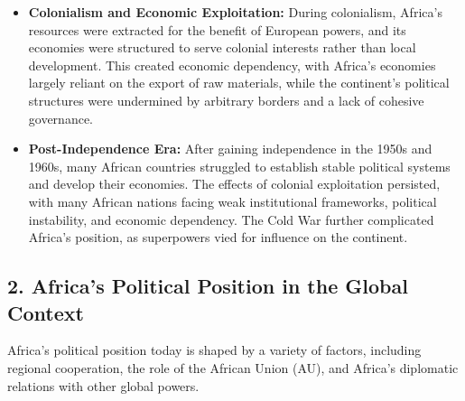 \documentclass[10pt]{article}
\begin{document}
\begin{itemize}
  \item \textbf{Colonialism and Economic Exploitation:} During colonialism, Africa's resources were
    extracted for the benefit of European powers, and its economies were structured to
    serve colonial interests rather than local development. This created economic
    dependency, with Africa's economies largely reliant on the export of raw materials, while
    the continent's political structures were undermined by arbitrary borders and a lack of
    cohesive governance.

  \item \textbf{Post-Independence Era:} After gaining independence in the 1950s and 1960s, many
    African countries struggled to establish stable political systems and develop their
    economies. The effects of colonial exploitation persisted, with many African nations
    facing weak institutional frameworks, political instability, and economic dependency.
    The Cold War further complicated Africa's position, as superpowers vied for influence on
    the continent.
\end{itemize}

\subsection*{2. Africa's Political Position in the Global Context}
Africa's political position today is shaped by a variety of factors, including regional cooperation,
the role of the African Union (AU), and Africa's diplomatic relations with other global powers.
\end{document}
